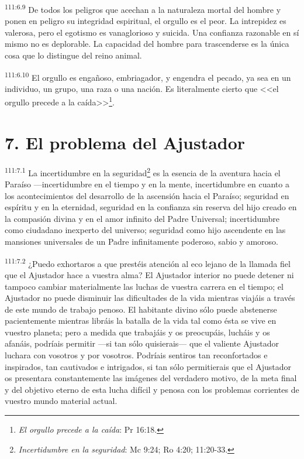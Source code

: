 \documentclass[twoside, 11pt]{book}
\begin{document}
\par
\textsuperscript{111:6.9} De todos los peligros que acechan a la naturaleza mortal del hombre y ponen en peligro su integridad espiritual, el orgullo es el peor. La intrepidez es valerosa, pero el egotismo es vanaglorioso y suicida. Una confianza razonable en sí mismo no es deplorable. La capacidad del hombre para trascenderse es la única cosa que lo distingue del reino animal.

\par
\textsuperscript{111:6.10} El orgullo es engañoso, embriagador, y engendra el pecado, ya sea en un individuo, un grupo, una raza o una nación. Es literalmente cierto que <<el orgullo precede a la caída>>\footnote{\textit{El orgullo precede a la caída}: Pr 16:18.}.

\section*{7. El problema del Ajustador}
\par
\textsuperscript{111:7.1} La incertidumbre en la seguridad\footnote{\textit{Incertidumbre en la seguridad}: Mc 9:24; Ro 4:20; 11:20-33.} es la esencia de la aventura hacia el Paraíso ---incertidumbre en el tiempo y en la mente, incertidumbre en cuanto a los acontecimientos del desarrollo de la ascensión hacia el Paraíso; seguridad en espíritu y en la eternidad, seguridad en la confianza sin reserva del hijo creado en la compasión divina y en el amor infinito del Padre Universal; incertidumbre como ciudadano inexperto del universo; seguridad como hijo ascendente en las mansiones universales de un Padre infinitamente poderoso, sabio y amoroso.

\par
\textsuperscript{111:7.2} ¿Puedo exhortaros a que prestéis atención al eco lejano de la llamada fiel que el Ajustador hace a vuestra alma? El Ajustador interior no puede detener ni tampoco cambiar materialmente las luchas de vuestra carrera en el tiempo; el Ajustador no puede disminuir las dificultades de la vida mientras viajáis a través de este mundo de trabajo penoso. El habitante divino sólo puede abstenerse pacientemente mientras libráis la batalla de la vida tal como ésta se vive en vuestro planeta; pero a medida que trabajáis y os preocupáis, lucháis y os afanáis, podríais permitir ---si tan sólo quisierais--- que el valiente Ajustador luchara con vosotros y por vosotros. Podríais sentiros tan reconfortados e inspirados, tan cautivados e intrigados, si tan sólo permitierais que el Ajustador os presentara constantemente las imágenes del verdadero motivo, de la meta final y del objetivo eterno de esta lucha difícil y penosa con los problemas corrientes de vuestro mundo material actual.
\end{document}
